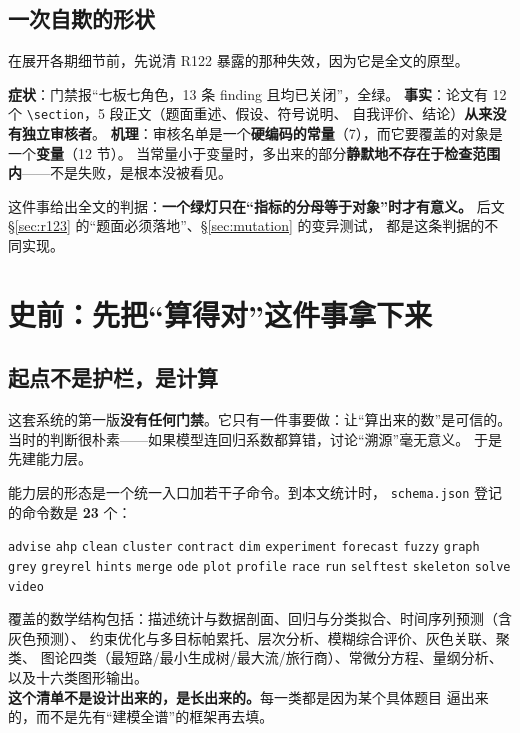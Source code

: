 \documentclass[11pt,a4paper]{article}
\newcommand{\code}[1]{\texttt{#1}}
\begin{document}
\subsection{一次自欺的形状}\label{sec:selfdeception}
在展开各期细节前，先说清 R122 暴露的那种失效，因为它是全文的原型。

\textbf{症状}：门禁报“七板七角色，13 条 finding 且均已关闭”，全绿。
\textbf{事实}：论文有 12 个 \code{\textbackslash section}，5 段正文（题面重述、假设、符号说明、
自我评价、结论）\textbf{从来没有独立审核者}。
\textbf{机理}：审核名单是一个\textbf{硬编码的常量}（7），而它要覆盖的对象是一个\textbf{变量}（12 节）。
当常量小于变量时，多出来的部分\textbf{静默地不存在于检查范围内}——不是失败，是根本没被看见。

这件事给出全文的判据：\textbf{一个绿灯只在“指标的分母等于对象”时才有意义。}
后文 §\ref{sec:r123} 的“题面必须落地”、§\ref{sec:mutation} 的变异测试，
都是这条判据的不同实现。

\section{史前：先把“算得对”这件事拿下来}

\subsection{起点不是护栏，是计算}
这套系统的第一版\textbf{没有任何门禁}。它只有一件事要做：让“算出来的数”是可信的。
当时的判断很朴素——如果模型连回归系数都算错，讨论“溯源”毫无意义。
于是先建能力层。

能力层的形态是一个统一入口加若干子命令。到本文统计时，
\code{schema.json} 登记的命令数是 \textbf{23} 个：

\begin{center}\small
\code{advise} \code{ahp} \code{clean} \code{cluster} \code{contract} \code{dim}
\code{experiment} \code{forecast} \code{fuzzy} \code{graph} \code{grey}
\code{greyrel} \code{hints} \code{merge} \code{ode} \code{plot} \code{profile}
\code{race} \code{run} \code{selftest} \code{skeleton} \code{solve} \code{video}
\end{center}

覆盖的数学结构包括：描述统计与数据剖面、回归与分类拟合、时间序列预测（含灰色预测）、
约束优化与多目标帕累托、层次分析、模糊综合评价、灰色关联、聚类、
图论四类（最短路/最小生成树/最大流/旅行商）、常微分方程、量纲分析、
以及十六类图形输出。\\[2pt]
\textbf{这个清单不是设计出来的，是长出来的。}每一类都是因为某个具体题目
逼出来的，而不是先有“建模全谱”的框架再去填。
\end{document}
